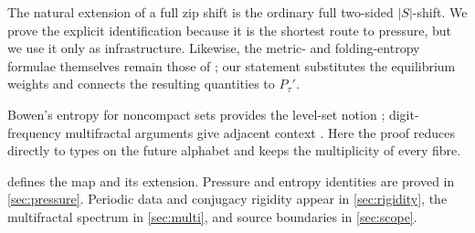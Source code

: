 The natural extension of a full zip shift is the ordinary full two-sided
$|S|$-shift.  We prove the explicit identification because it is the shortest
route to pressure, but we use it only as infrastructure.  Likewise, the
metric- and folding-entropy formulae themselves remain those of
\citet{MartinsMattosVarao2026}; our statement substitutes the equilibrium
weights and connects the resulting quantities to $P_\tau'$.

Bowen's entropy for noncompact sets provides the level-set notion
\citep{Bowen1973}; digit-frequency multifractal arguments give adjacent
context \citep{BarreiraSaussolSchmeling2002}.  Here the proof reduces directly
to types on the future alphabet and keeps the multiplicity of every fibre.

 defines the map and its extension.  Pressure and entropy
identities are proved in \cref{sec:pressure}.  Periodic data and conjugacy
rigidity appear in \cref{sec:rigidity}, the multifractal spectrum in
\cref{sec:multi}, and source boundaries in \cref{sec:scope}.
